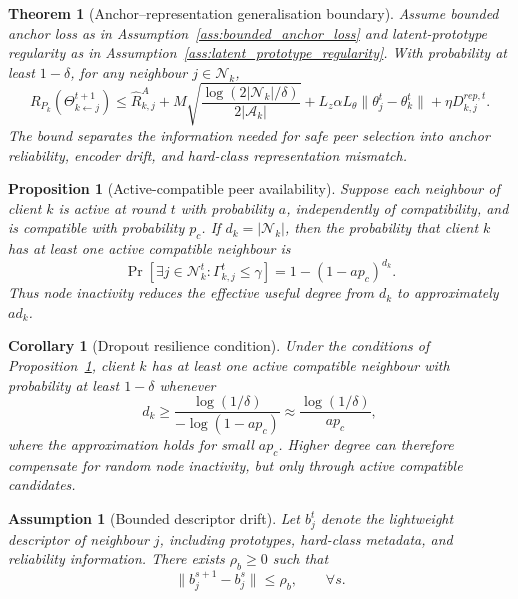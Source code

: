 \documentclass[conference]{IEEEtran}
\newtheorem{assumption}{Assumption}
\newtheorem{proposition}{Proposition}
\newtheorem{theorem}{Theorem}
\newtheorem{corollary}{Corollary}
\begin{document}
\begin{theorem}[Anchor--representation generalisation boundary]
\label{thm:anchor_representation_generalisation}
Assume bounded anchor loss as in Assumption~\ref{ass:bounded_anchor_loss} and latent-prototype regularity as in Assumption~\ref{ass:latent_prototype_regularity}. With probability at least \(1-\delta\), for any neighbour \(j\in\mathcal{N}_k\),
\begin{equation*}
R_{P_k}(\Theta_{k\leftarrow j}^{t+1})
\leq
\widehat{R}_{k,j}^{A}
+
M\sqrt{
\frac{\log(2|\mathcal{N}_k|/\delta)}
{2|\mathcal{A}_k|}
}
+
L_z\alpha L_\theta\|\theta_j^t-\theta_k^t\|
+
\eta D_{k,j}^{rep,t}.
\end{equation*}
The bound separates the information needed for safe peer selection into anchor reliability, encoder drift, and hard-class representation mismatch.
\end{theorem}

\begin{proposition}[Active-compatible peer availability]
\label{prop:active_compatible_availability}
Suppose each neighbour of client \(k\) is active at round \(t\) with probability \(a\), independently of compatibility, and is compatible with probability \(p_c\). If \(d_k=|\mathcal{N}_k|\), then the probability that client \(k\) has at least one active compatible neighbour is
\begin{equation*}
\Pr\!\left[
\exists j\in\mathcal{N}_k^t:
\Gamma_{k,j}^t\leq\gamma
\right]
=
1-(1-a p_c)^{d_k}.
\end{equation*}
Thus node inactivity reduces the effective useful degree from \(d_k\) to approximately \(a d_k\).
\end{proposition}

\begin{corollary}[Dropout resilience condition]
\label{cor:dropout_resilience}
Under the conditions of Proposition~\ref{prop:active_compatible_availability}, client \(k\) has at least one active compatible neighbour with probability at least \(1-\delta\) whenever
\begin{equation*}
d_k
\geq
\frac{\log(1/\delta)}
{-\log(1-a p_c)}
\approx
\frac{\log(1/\delta)}{a p_c},
\end{equation*}
where the approximation holds for small \(a p_c\). Higher degree can therefore compensate for random node inactivity, but only through active compatible candidates.
\end{corollary}

\begin{assumption}[Bounded descriptor drift]
\label{ass:bounded_descriptor_drift}
Let \(b_j^t\) denote the lightweight descriptor of neighbour \(j\), including prototypes, hard-class metadata, and reliability information. There exists \(\rho_b\geq0\) such that
\begin{equation*}
\|b_j^{s+1}-b_j^s\|
\leq
\rho_b,
\qquad
\forall s .
\end{equation*}
\end{assumption}
\end{document}
